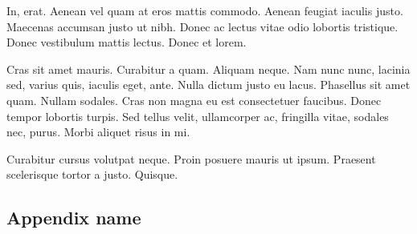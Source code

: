 \documentclass[a4paper]{article}
\begin{document}
In, erat. Aenean vel quam at eros mattis commodo. Aenean feugiat iaculis justo.
Maecenas accumsan justo ut nibh. Donec ac lectus vitae odio lobortis tristique.
Donec vestibulum mattis lectus. Donec et lorem.

Cras sit amet mauris. Curabitur a quam. Aliquam neque. Nam nunc nunc, lacinia
sed, varius quis, iaculis eget, ante. Nulla dictum justo eu lacus. Phasellus sit
amet quam. Nullam sodales. Cras non magna eu est consectetuer faucibus. Donec
tempor lobortis turpis. Sed tellus velit, ullamcorper ac, fringilla vitae,
sodales nec, purus. Morbi aliquet risus in mi.

Curabitur cursus volutpat neque. Proin posuere mauris ut ipsum. Praesent
scelerisque tortor a justo. Quisque.

%
%

\newpage

\begin{appendices}

\section{Appendix name}
\label{app:}


%

\end{appendices}
\end{document}
